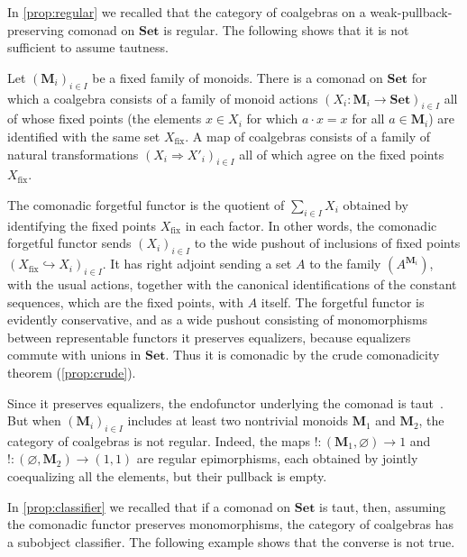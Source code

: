 \documentclass[11pt, oneside, article]{memoir}
\theoremstyle{plain}
\theoremstyle{definition}
\theoremstyle{remark}
\newenvironment{counterexample}
{\renewcommand\qedsymbol{$\lrcorner$}%
  \pushQED{\qed}\mycounterexample}
{\popQED\endmycounterexample}
\newcommand{\bang}{\mathrm{!}}
\newcommand{\namedcat}[1]{\mathbf{#1}}
\newcommand{\cat}[1]{\mathbf{#1}}
\newcommand{\Set}{\namedcat{Set}}
\newcommand{\xA}{A}
\newcommand{\xX}{X}
\newcommand{\bM}{\cat{M}}
\newcommand{\act}{\mathbin{\cdot}}
\begin{document}
In \cref{prop:regular} we recalled that the category of coalgebras on
a weak-pullback-preserving comonad on $\Set$ is regular. The following
shows that it is not sufficient to assume tautness.

\begin{counterexample}[Non-regular taut comonad]\label{ex:monoids}
  Let $(\bM_i)_{i \in I}$ be a fixed family of monoids. There is a
  comonad on $\Set$ for which a coalgebra consists of a family of
  monoid actions $(\xX_i \colon \bM_i \to \Set)_{i \in I}$ all of whose
  fixed points (the elements $x \in \xX_i$ for which $a \act x = x$
  for all $a \in \bM_i$) are identified with the same set
  $\xX_\mathrm{fix}$.  A map of coalgebras consists of a family of
  natural transformations $(\xX_i \Rightarrow \xX'_i)_{i \in I}$ all
  of which agree on the fixed points $\xX_\mathrm{fix}$.

  The comonadic forgetful functor is the quotient of
  $\sum_{i \in I}\xX_i$ obtained by identifying the fixed points
  $\xX_\mathrm{fix}$ in each factor. In other words, the comonadic
  forgetful functor sends $(\xX_i)_{i \in I}$ to the wide pushout of
  inclusions of fixed points
  $(\xX_\mathrm{fix} \hookrightarrow \xX_i)_{i \in I}$. It has right
  adjoint sending a set $\xA$ to the family $(\xA^{\bM_i})$, with the usual
  actions, together with the canonical identifications of the constant
  sequences, which are the fixed points, with $\xA$ itself. The
  forgetful functor is evidently conservative, and as a wide pushout
  consisting of monomorphisms between representable functors it
  preserves equalizers, because equalizers commute with unions in
  $\Set$. Thus it is comonadic by the crude comonadicity theorem (\cref{prop:crude}).

  Since it preserves equalizers, the endofunctor underlying the
  comonad is taut~\cite[VII.11]{trnkova}. But when $(\bM_i)_{i \in I}$
  includes at least two nontrivial monoids $\bM_1$ and $\bM_2$, the
  category of coalgebras is not regular. Indeed, the maps
  $\bang \colon (\bM_1,\varnothing) \to 1$ and
  $\bang \colon (\varnothing,\bM_2) \to (1,1)$ are regular epimorphisms,
  each obtained by jointly coequalizing all the elements, but their
  pullback is empty.
\end{counterexample}

In \cref{prop:classifier} we recalled that if a comonad on $\Set$ is
taut, then, assuming the comonadic functor preserves monomorphisms,
the category of coalgebras has a subobject classifier. The following
example shows that the converse is not true.
\end{document}
